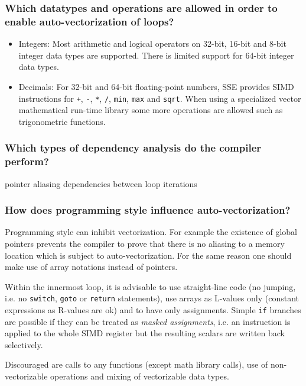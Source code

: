 \documentclass[11pt]{article}
\begin{document}
\subsubsection*{Which datatypes and operations are allowed in order to enable auto-vectorization of loops?}
\begin{itemize}
\item Integers: Most arithmetic and logical operators on 32-bit, 16-bit and 8-bit integer data types are supported. There is limited support for 64-bit integer data types.
\item Decimals: For 32-bit and 64-bit floating-point numbers, SSE provides SIMD instructions for \texttt{+}, \texttt{-}, \texttt{*}, \texttt{/}, \texttt{min}, \texttt{max} and \texttt{sqrt}. When using a specialized vector mathematical run-time library some more operations are allowed such as trigonometric functions.
\end{itemize}

\subsubsection*{Which types of dependency analysis do the compiler perform?}

pointer aliasing
dependencies between loop iterations

\subsubsection*{How does programming style influence auto-vectorization?}
Programming style can inhibit vectorization. For example the existence of global pointers prevents the compiler to prove that there is no aliasing to a memory location which is subject to auto-vectorization. For the same reason one should make use of array notations instead of pointers.



Within the innermost loop, it is advisable to use straight-line code (no jumping, i.e. no \texttt{switch}, \texttt{goto} or \texttt{return} statements), use arrays as L-values only (constant expressions as R-values are ok) and to have only assignments. Simple \texttt{if} branches are possible if they can be treated as \textit{masked assignments}, i.e. an instruction is applied to the whole SIMD register but the resulting scalars are written back selectively.

Discouraged are calls to any functions (except math library calls), use of non-vectorizable operations and mixing of vectorizable data types.
\end{document}
